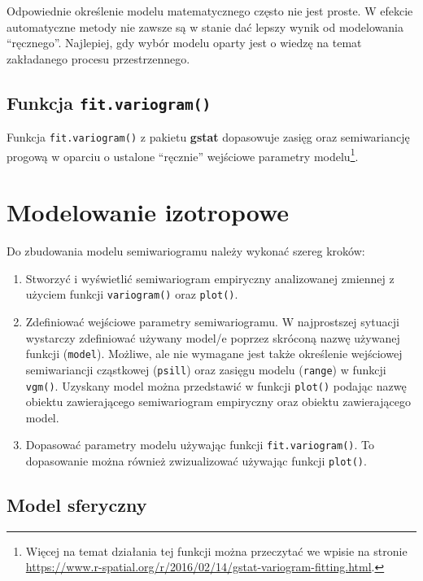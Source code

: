 \documentclass[
  paper=6in:9in,pagesize=pdftex,headinclude=on,footinclude=on,10pt]{scrbook}
\providecommand{\tightlist}{%
  \setlength{\itemsep}{0pt}\setlength{\parskip}{0pt}}
\begin{document}
Odpowiednie określenie modelu matematycznego często nie jest proste.
W efekcie automatyczne metody nie zawsze są w stanie dać lepszy wynik od modelowania ``ręcznego''.
Najlepiej, gdy wybór modelu oparty jest o wiedzę na temat zakładanego procesu przestrzennego.

\subsection{\texorpdfstring{Funkcja \texttt{fit.variogram()}}{Funkcja fit.variogram()}}\label{funkcja-fit.variogram}

Funkcja \texttt{fit.variogram()} z pakietu \textbf{gstat} dopasowuje zasięg oraz semiwariancję progową w oparciu o ustalone ``ręcznie'' wejściowe parametry modelu\footnote{Więcej na temat działania tej funkcji można przeczytać we wpisie na stronie \url{https://www.r-spatial.org/r/2016/02/14/gstat-variogram-fitting.html}.}.

\section{Modelowanie izotropowe}\label{modelowanie-izotropowe}

Do zbudowania modelu semiwariogramu należy wykonać szereg kroków:

\begin{enumerate}
\def\labelenumi{\arabic{enumi}.}
\tightlist
\item
  Stworzyć i wyświetlić semiwariogram empiryczny analizowanej zmiennej z użyciem funkcji \texttt{variogram()} oraz \texttt{plot()}.
\item
  Zdefiniować wejściowe parametry semiwariogramu.
  W najprostszej sytuacji wystarczy zdefiniować używany model/e poprzez skróconą nazwę używanej funkcji (\texttt{model}).
  Możliwe, ale nie wymagane jest także określenie wejściowej semiwariancji cząstkowej (\texttt{psill}) oraz zasięgu modelu (\texttt{range}) w funkcji \texttt{vgm()}.
  Uzyskany model można przedstawić w funkcji \texttt{plot()} podając nazwę obiektu zawierającego semiwariogram empiryczny oraz obiektu zawierającego model.
\item
  Dopasować parametry modelu używając funkcji \texttt{fit.variogram()}.
  To dopasowanie można również zwizualizować używając funkcji \texttt{plot()}.
\end{enumerate}

\subsection{Model sferyczny}\label{model-sferyczny}
\end{document}
